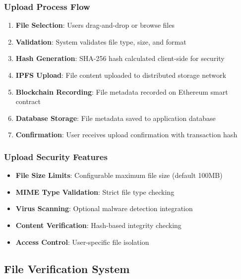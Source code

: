 \documentclass[11pt,a4paper]{article}
\begin{document}
\subsubsection{Upload Process Flow}
\begin{enumerate}
    \item \textbf{File Selection}: Users drag-and-drop or browse files
    \item \textbf{Validation}: System validates file type, size, and format
    \item \textbf{Hash Generation}: SHA-256 hash calculated client-side for security
    \item \textbf{IPFS Upload}: File content uploaded to distributed storage network
    \item \textbf{Blockchain Recording}: File metadata recorded on Ethereum smart contract
    \item \textbf{Database Storage}: File metadata saved to application database
    \item \textbf{Confirmation}: User receives upload confirmation with transaction hash
\end{enumerate}

\subsubsection{Upload Security Features}
\begin{itemize}
    \item \textbf{File Size Limits}: Configurable maximum file size (default 100MB)
    \item \textbf{MIME Type Validation}: Strict file type checking
    \item \textbf{Virus Scanning}: Optional malware detection integration
    \item \textbf{Content Verification}: Hash-based integrity checking
    \item \textbf{Access Control}: User-specific file isolation
\end{itemize}

\subsection{File Verification System}
\end{document}
